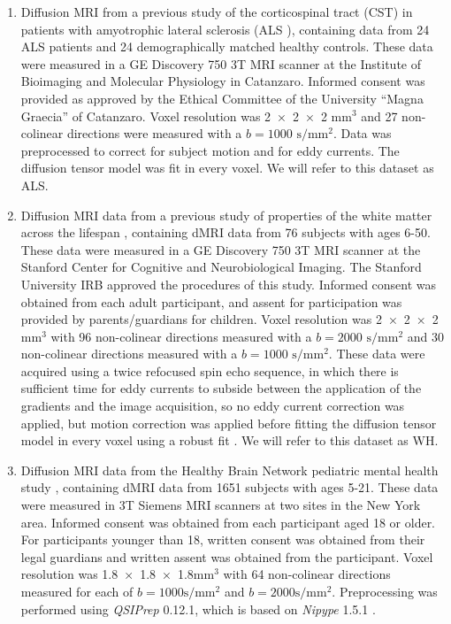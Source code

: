 \documentclass[10pt,letterpaper]{article}
\begin{document}
\begin{enumerate}

\item Diffusion MRI from a previous study of the corticospinal
tract (CST) in patients with amyotrophic lateral sclerosis
(ALS \cite{sarica2017corticospinal}), containing data from 24 ALS
patients and 24 demographically matched healthy controls. These data
were measured in a GE Discovery 750 3T MRI scanner at the Institute
of Bioimaging and Molecular Physiology in Catanzaro. Informed consent
was provided as approved by the Ethical Committee of the University
``Magna Graecia'' of Catanzaro. Voxel resolution was \num{2x2x2}
$\text{mm}^3$ and 27 non-colinear directions were measured with a
$b=1000$ $\text{s} / \text{mm}^2$. Data was preprocessed to
correct for subject motion and for eddy currents. The diffusion tensor
model \cite{basser1994mr} was fit in every voxel.
We will refer to this dataset as ALS.

\item Diffusion MRI data from a previous study of properties of
the white matter across the lifespan \cite{yeatman2014lifespan},
containing dMRI data from 76 subjects with ages 6-50. These data were
measured in a GE Discovery 750 3T MRI scanner at the Stanford Center
for Cognitive and Neurobiological Imaging. The Stanford University
IRB approved the procedures of this study. Informed consent was
obtained from each adult participant, and assent for participation
was provided by parents/guardians for children. Voxel resolution was
\num{2x2x2}$\textrm{mm}^3$ with 96 non-colinear directions measured with a
$b=2000$ $\textrm{s} / \textrm{mm}^2$ and 30 non-colinear directions
measured with a $b=1000$ $\textrm{s} / \textrm{mm}^2$. These data
were acquired using a twice refocused spin echo sequence, in which there is
sufficient time for eddy currents to subside between the application of
the gradients and the image acquisition, so no eddy current correction
was applied, but motion correction was applied before fitting the
diffusion tensor model \cite{basser1994mr} in every voxel using a robust
fit \cite{chang2005restore}
.
We will refer to this dataset as WH.

\item Diffusion MRI data from the Healthy Brain Network pediatric mental
health study \cite{alexander2017open}, containing dMRI data from 1651 subjects
with ages 5-21. These data were measured in 3T Siemens MRI scanners at two
sites in the New York
area.
Informed consent was obtained from each participant aged 18 or older. For
participants younger than 18, written consent was obtained from their legal
guardians and written assent was obtained from the participant. Voxel
resolution was \num{1.8x1.8x1.8}$\text{mm}^3$ with 64 non-colinear directions
measured for each of $b=1000 \text{s} / \text{mm}^2$ and $b=2000 \text{s} /
\text{mm}^2$. Preprocessing was performed using \emph{QSIPrep} 0.12.1, which
is based on \emph{Nipype} 1.5.1 \cite[RRID:SCR\_002502]{nipype1,nipype2}.


\end{enumerate}
\end{document}
